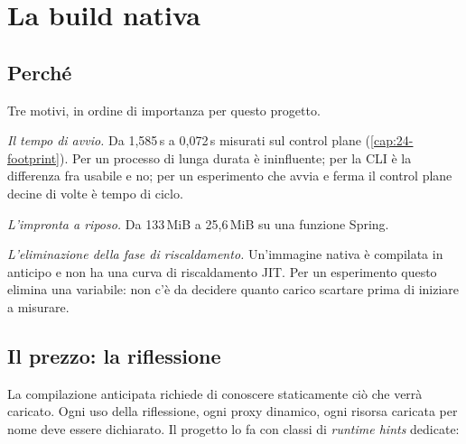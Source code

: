 \section{La build nativa}

\subsection{Perch\'e}

Tre motivi, in ordine di importanza per questo progetto.

\emph{Il tempo di avvio.} Da 1{,}585\,s a 0{,}072\,s misurati sul control plane
(\cref{cap:24-footprint}). Per un processo di lunga durata \`e ininfluente; per
la CLI \`e la differenza fra usabile e no; per un esperimento che avvia e ferma
il control plane decine di volte \`e tempo di ciclo.

\emph{L'impronta a riposo.} Da 133\,MiB a 25{,}6\,MiB su una funzione Spring.

\emph{L'eliminazione della fase di riscaldamento.} Un'immagine nativa \`e
compilata in anticipo e non ha una curva di riscaldamento JIT. Per un esperimento
questo elimina una variabile: non c'\`e da decidere quanto carico scartare prima
di iniziare a misurare.

\subsection{Il prezzo: la riflessione}

La compilazione anticipata richiede di conoscere staticamente ci\`o che verr\`a
caricato. Ogni uso della riflessione, ogni proxy dinamico, ogni risorsa caricata
per nome deve essere dichiarato. Il progetto lo fa con classi di \emph{runtime
hints} dedicate:

